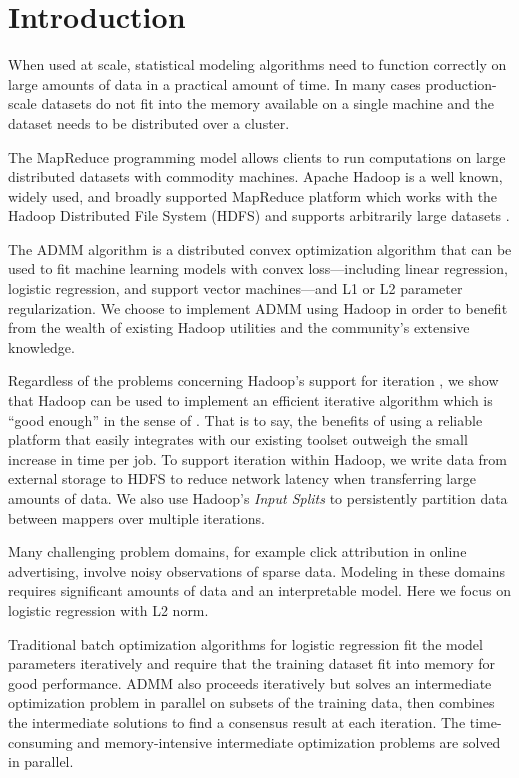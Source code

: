 \documentclass[10pt, conference, compsocconf]{IEEEtran}
\begin{document}
\section{Introduction}
When used at scale, statistical modeling algorithms need to function correctly on large amounts of data in a practical amount of time.  In many cases production-scale datasets do not fit into the memory available on a single machine and the dataset needs to be distributed over a cluster.

The MapReduce programming model \cite{dean2004} allows clients to run computations on large distributed datasets with commodity machines.  Apache Hadoop is a well known, widely used, and broadly supported MapReduce platform which works with the Hadoop Distributed File System (HDFS)  and supports arbitrarily large datasets \cite{white2009}.

The ADMM algorithm \cite{boyd} is a distributed convex optimization algorithm that can be used to fit machine learning models with convex loss---including linear regression, logistic regression, and support vector machines---and L1 or L2 parameter regularization.  We choose to implement ADMM using Hadoop in order to benefit from the wealth of existing Hadoop utilities and the community's extensive knowledge.

Regardless of the problems concerning Hadoop's support for iteration \cite{bu2010}, we show that Hadoop can be used to implement an efficient iterative algorithm which is ``good enough'' in the sense of \cite{lin2012}.  That is to say, the benefits of using a reliable platform that easily integrates with our existing toolset outweigh the small increase in time per job.  To support iteration within Hadoop, we write data from external storage to HDFS to reduce network latency when transferring large amounts of data.  We also use Hadoop's \emph{Input Splits} to persistently partition data between mappers over multiple iterations. 

Many challenging problem domains, for example click attribution in online advertising, involve noisy observations of sparse data.  Modeling in these domains requires significant amounts of data and an interpretable model.  Here we focus on logistic regression with L2 norm.

Traditional batch optimization algorithms for logistic regression fit the model parameters iteratively and require that the training dataset fit into memory for good performance. ADMM also proceeds iteratively but solves an intermediate optimization problem in parallel on subsets of the training data, then combines the intermediate solutions to find a consensus result at each iteration. The time-consuming and memory-intensive intermediate optimization problems are solved in parallel.
\end{document}
